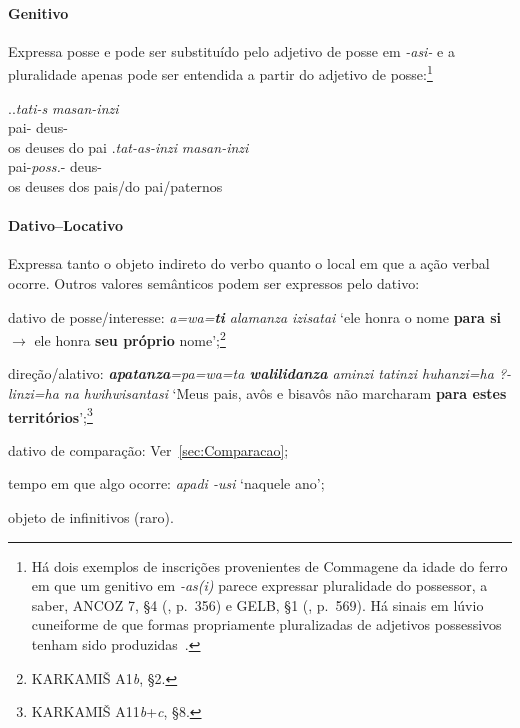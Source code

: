 \paragraph{Genitivo}
Expressa posse e pode ser substituído pelo adjetivo de posse em \emph{-asi-} e a
pluralidade apenas pode ser entendida a partir do adjetivo de posse:\footnote{
Há dois exemplos de inscrições provenientes de Commagene da idade do ferro em
que um genitivo em \emph{-as{(i)}} parece expressar pluralidade do possessor,
a saber, ANCOZ 7, §4 (, p.\ 356) e GELB, §1
(, p.\ 569). Há sinais em lúvio cuneiforme de que formas
propriamente pluralizadas de adjetivos possessivos tenham sido
produzidas~\citep[pp. 45ff.]{Yakubovich2010}.
}

\ex.\ag.\emph{tati-s} \emph{masan-inzi}\\
pai-\Gen\Sg\Com{} deus-\Nom\Pl\Com{}\\
os deuses do pai
\bg.\emph{tat-as-inzi} \emph{masan-inzi}\\
pai-\emph{poss.}-\Nom\Pl\Com{} deus-\Nom\Pl\Com{}\\
os deuses dos pais\slash{}do pai\slash{}paternos


\paragraph{Dativo--Locativo}
Expressa tanto o objeto indireto do verbo quanto o local em que a ação verbal
ocorre. Outros valores semânticos podem ser expressos pelo dativo:
\begin{inparaenum}[(a)]
	\item dativo de posse\slash{}interesse:
	\emph{a=wa=\textbf{ti} alamanza izisatai}
	`ele
	honra o nome \textbf{para si} $\rightarrow$ ele honra \textbf{seu próprio}
	nome';\footnote{KARKAMIŠ A1\emph{b}, §2.}
	\item  direção\slash{}alativo:
	\emph{\textbf{apatanza}=pa=wa=ta \textbf{walilidanza} aminzi tatinzi
	huhanzi=ha {?}-linzi=ha na hwi\-hwisantasi}
	`Meus pais, avôs e bisavôs não marcharam \textbf{para estes
		territórios}';\footnote{KARKAMIŠ A11\emph{b}+\emph{c}, §8.}
	\item dativo de comparação: Ver~\autoref{sec:Comparacao};
	\item tempo em que algo ocorre: \emph{apa\-di -usi} `naquele ano';
	\item objeto de infinitivos (raro).
\end{inparaenum}


